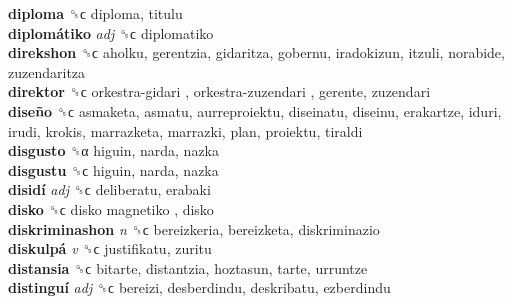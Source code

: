 \textbf{diploma} ␝ϲ  diploma, titulu  \\
\textbf{diplomátiko} \emph{adj}  ␝ϲ  diplomatiko  \\
\textbf{direkshon} ␝ϲ  aholku, gerentzia, gidaritza, gobernu, iradokizun, itzuli, norabide, zuzendaritza  \\
\textbf{direktor} ␝ϲ   orkestra-gidari ,  orkestra-zuzendari , gerente, zuzendari  \\
\textbf{diseño} ␝ϲ  asmaketa, asmatu, aurreproiektu, diseinatu, diseinu, erakartze, iduri, irudi, krokis, marrazketa, marrazki, plan, proiektu, tiraldi  \\
\textbf{disgusto} ␝α  higuin, narda, nazka  \\
\textbf{disgustu} ␝ϲ  higuin, narda, nazka  \\
\textbf{disidí} \emph{adj}  ␝ϲ  deliberatu, erabaki  \\
\textbf{disko} ␝ϲ   disko magnetiko , disko  \\
\textbf{diskriminashon} \emph{n}  ␝ϲ  bereizkeria, bereizketa, diskriminazio  \\
\textbf{diskulpá} \emph{v}  ␝ϲ  justifikatu, zuritu  \\
\textbf{distansia} ␝ϲ  bitarte, distantzia, hoztasun, tarte, urruntze  \\
\textbf{distinguí} \emph{adj}  ␝ϲ  bereizi, desberdindu, deskribatu, ezberdindu  \\

